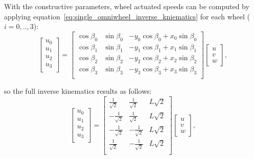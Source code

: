 With the constructive parameters, wheel actuated speeds can be computed by applying equation~\ref{eq:single_omniwheel_inverse_kniematics} for each wheel ($i=0,..,3$):
\begin{equation}
\left[
\begin{array}{c}
u_0 \\
u_1 \\
u_2 \\
u_3 \\
\end{array}
\right]
=
\left[
\begin{array}{ccc}
 \cos \beta_0 & \sin \beta_0 & -y_0\cos \beta_0+x_0 \sin \beta_0 \\
 \cos \beta_1 & \sin \beta_1 & -y_1\cos \beta_1+x_1 \sin \beta_1 \\
 \cos \beta_2 & \sin \beta_2 & -y_2\cos \beta_2+x_2 \sin \beta_2 \\
 \cos \beta_3 & \sin \beta_3 & -y_3\cos \beta_3+x_3 \sin \beta_3 \\
\end{array}
\right]
\left[
\begin{array}{c}
 u \\
 v\\
 w
\end{array}
\right], 
\end{equation}

so the full inverse kinematics results as follows: 
\begin{equation}
\left[
\begin{array}{c}
u_0 \\
u_1 \\
u_2 \\
u_3 \\
\end{array}
\right]
=
\left[
\begin{array}{ccc}
 \frac{1}{\sqrt{2}} & \frac{1}{\sqrt{2}} & L\sqrt{2} \\
 -\frac{1}{\sqrt{2}} & \frac{1}{\sqrt{2}} & L\sqrt{2} \\
 -\frac{1}{\sqrt{2}} & -\frac{1}{\sqrt{2}} & L\sqrt{2} \\
 \frac{1}{\sqrt{2}} & -\frac{1}{\sqrt{2}} & L\sqrt{2} \\
\end{array}
\right]
\left[
\begin{array}{c}
 u \\
 v\\
 w
\end{array}
\right], 
\end{equation}

